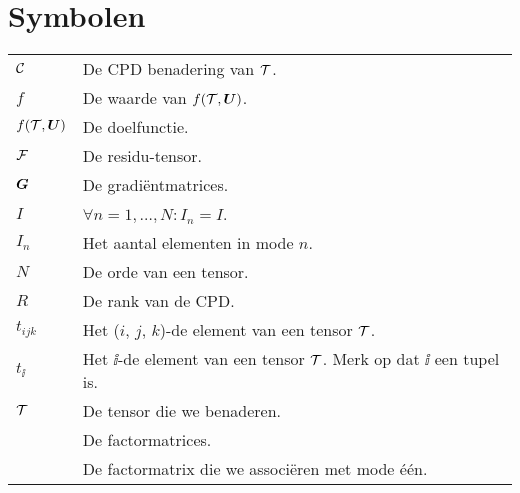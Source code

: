 \documentclass[master=cws ,masteroption=gs]{kulemt}
\begin{document}
\section*{Symbolen}
\begin{flushleft}
	\renewcommand{\arraystretch}{1.1}
	\begin{tabularx}{\textwidth}{@{}p{12mm}X@{}}
		$\mathcal{C}$	& De CPD benadering van $\mathcal{T}$.\\
		$f$				& De waarde van $f(\mathcal{T}, \boldsymbol{U})$.\\
		$f(\mathcal{T}, \boldsymbol{U})$	& De doelfunctie.\\
		$\mathcal{F}$		& De residu-tensor.\\
		$\boldsymbol{G}$			& De gradi\"entmatrices.\\
		$I$				& $\forall n = 1, \ldots, N: I_n = I$.\\
		$I_n$			& Het aantal elementen in mode $n$.\\
		$N$				& De orde van een tensor.\\
		$R$				& De rank van de CPD.\\
		$t_{ijk}$		& Het ($i$, $j$, $k$)-de element van een tensor $\mathcal{T}$.\\
		$t_{\ii}$		& Het $\ii$-de element van een tensor $\mathcal{T}$. Merk op dat $\ii$ een tupel is.\\
		$\mathcal{T}$		& De tensor die we benaderen.\\
		\UUU{}			& De factormatrices.\\
		\UU{1}			& De factormatrix die we associ\"eren met mode \'e\'en.\\
	\end{tabularx}
\end{flushleft}

\mainmatter










\appendixpage*          %
\appendix



\backmatter


\end{document}
